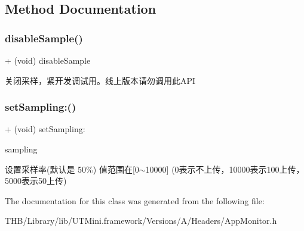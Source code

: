 \subsection{Method Documentation}
\mbox{\label{interface_app_monitor_a20bd877ea45f47a4b2a1952b80be73ee}} 
\subsubsection{\texorpdfstring{disable\+Sample()}{disableSample()}}
{\footnotesize\ttfamily + (void) disable\+Sample \begin{DoxyParamCaption}{ }\end{DoxyParamCaption}}

关闭采样，紧开发调试用。线上版本请勿调用此\+A\+PI \mbox{\label{interface_app_monitor_aa20ec8d80e9bd57158a485c1519a9547}} 
\subsubsection{\texorpdfstring{set\+Sampling\+:()}{setSampling:()}}
{\footnotesize\ttfamily + (void) set\+Sampling\+: \begin{DoxyParamCaption}\item[{(N\+S\+String $\ast$)}]{sampling }\end{DoxyParamCaption}}

设置采样率(默认是 50\%) 值范围在\mbox{[}0$\sim$10000\mbox{]} (0表示不上传，10000表示100上传，5000表示50上传) 

The documentation for this class was generated from the following file\+:\begin{DoxyCompactItemize}
\item 
T\+H\+B/\+Library/lib/\+U\+T\+Mini.\+framework/\+Versions/\+A/\+Headers/App\+Monitor.\+h\end{DoxyCompactItemize}

